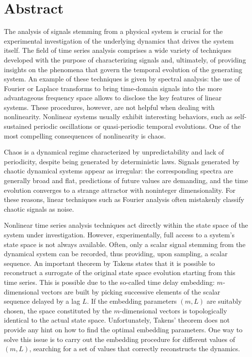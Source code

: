 \chapter*{Abstract}

The analysis of signals stemming from a physical system is crucial for the experimental investigation
of the underlying dynamics that drives the system itself. The field of time series analysis comprises
a wide variety of techniques developed with the purpose of characterizing signals and, ultimately, of
providing insights on the phenomena that govern the temporal evolution of the generating system.
An example of these techniques is given by spectral analysis: the use of Fourier or Laplace transforms
to bring time-domain signals into the more advantageous frequency space allows to disclose the key
features of linear systems. These procedures, however, are not helpful when dealing with nonlinearity.
Nonlinear systems usually exhibit interesting behaviors, such as self-sustained periodic oscillations
or quasi-periodic temporal evolutions. One of the most compelling consequences of nonlinearity is chaos.

Chaos is a dynamical regime characterized by unpredictability and lack of periodicity, despite being
generated by deterministic laws. Signals generated by chaotic dynamical systems appear as irregular:
the corresponding spectra are generally broad and flat, predictions of future values are demanding,
and the time evolution converges to a strange attractor with noninteger dimensionality.
For these reasons, linear techniques such as Fourier analysis often mistakenly classify chaotic signals
as noise.

Nonlinear time series analysis techniques act directly within the state space of the system under
investigation. However, experimentally, full access to a system's state space is not always available.
Often, only a scalar signal stemming from the dynamical system can be recorded, thus providing, upon
sampling, a scalar sequence. An important theorem by Takens states that it is possible to reconstruct
a surrogate of the original state space evolution starting from this time series. This is possible
due to the so-called time delay embedding: $m$-dimensional vectors are built by picking successive
elements of the scalar sequence delayed by a lag $L$. If the embedding parameters $(m,L)$ are
suitably chosen, the space constituted by the $m$-dimensional vectors is topologically identical
to the actual state space. Unfortunately, Takens' theorem does not provide any hint on how to find
the optimal embedding parameters. One way to solve this issue is to carry out the embedding procedure
for different values of $(m,L)$, searching for a set of values that correctly reconstructs the
dynamics.

